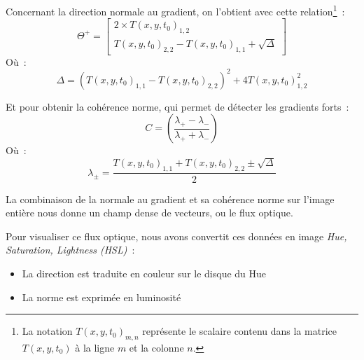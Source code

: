 \documentclass[fleqn,10pt]{SelfArx} %
\newcommand{\T}{T(x, y, t_{0})}
\newcommand{\Gx}{G_{x}(x,y,t_{0})}
\newcommand{\Gy}{G_{y}(x,y,t_{0})}
\begin{document}
Concernant la direction normale au gradient, on l'obtient avec cette relation\footnote{La notation $\T_{m,n}$
représente le scalaire contenu dans la matrice $\T$ à la ligne $m$ et la colonne $n$.}~:
\[
    \Theta^{+} = 
    \begin{bmatrix}
        2 \times \T_{1,2} \\
        \T_{2,2} - \T_{1,1} + \sqrt{\Delta}
    \end{bmatrix}
\]
Où~:
\[
    \Delta = (\T_{1,1} - \T_{2,2})^{2} + 4 \T_{1,2}^{2}
\]

Et pour obtenir la cohérence norme, qui permet de détecter les gradients forts~:
\[
    C = \left(\frac{\lambda_{+} - \lambda_{-}}{\lambda_{+} + \lambda_{-}}\right)
\]
Où~:
\[
    \lambda_{\pm} = \frac{\T_{1,1} + \T_{2,2} \pm \sqrt{\Delta}}{2}
\]

La combinaison de la normale au gradient et sa cohérence norme sur l'image entière nous donne un champ 
dense de vecteurs, ou le flux optique.

Pour visualiser ce flux optique, nous avons convertit ces données en image {\em Hue,
Saturation, Lightness (HSL)}~:
\begin{itemize}
    \item La direction est traduite en couleur sur le disque du Hue
    \item La norme est exprimée en luminosité
\end{itemize}
\end{document}
